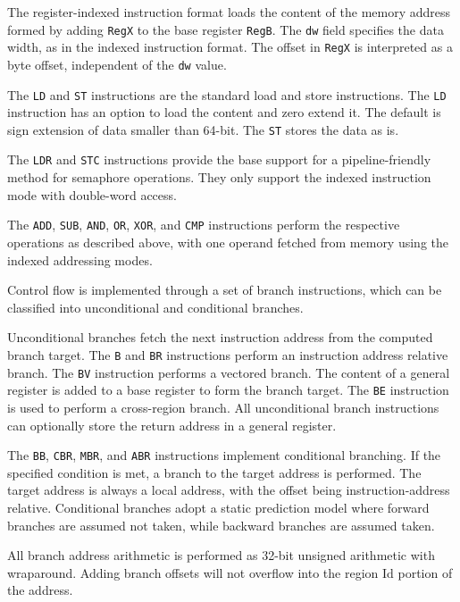 The register-indexed instruction format loads the content of the memory address formed by adding \texttt{RegX} to the base register \texttt{RegB}. The \texttt{dw} field specifies the data width, as in the indexed instruction format. The offset in \texttt{RegX} is interpreted as a byte offset, independent of the \texttt{dw} value. 

The \texttt{LD} and \texttt{ST} instructions are the standard load and store instructions. The \texttt{LD} instruction has an option to load the content and zero extend it. The default is sign extension of data smaller than 64-bit. The \texttt{ST} stores the data as is.  

The \texttt{LDR} and \texttt{STC} instructions provide the base support for a pipeline-friendly method for semaphore operations. They only support the indexed instruction mode with double-word access.  

The \texttt{ADD}, \texttt{SUB}, \texttt{AND}, \texttt{OR}, \texttt{XOR}, and \texttt{CMP} instructions perform the respective operations as described above, with one operand fetched from memory using the indexed addressing modes.


Control flow is implemented through a set of branch instructions, which can be classified into unconditional and conditional branches.  

Unconditional branches fetch the next instruction address from the computed branch target. The \texttt{B} and \texttt{BR} instructions perform an instruction address relative branch.  The \texttt{BV} instruction performs a vectored branch. The content of a general register is added to a base register to form the branch target. The \texttt{BE} instruction is used to perform a cross-region branch. All unconditional branch instructions can optionally store the return address in a general register.

The \texttt{BB}, \texttt{CBR}, \texttt{MBR}, and \texttt{ABR} instructions implement conditional branching. If the specified condition is met, a branch to the target address is performed. The target address is always a local address, with the offset being instruction-address relative. Conditional branches adopt a static prediction model where forward branches are assumed not taken, while backward branches are assumed taken.  

All branch address arithmetic is performed as 32-bit unsigned arithmetic with wraparound. Adding branch offsets will not overflow into the region Id portion of the address.

